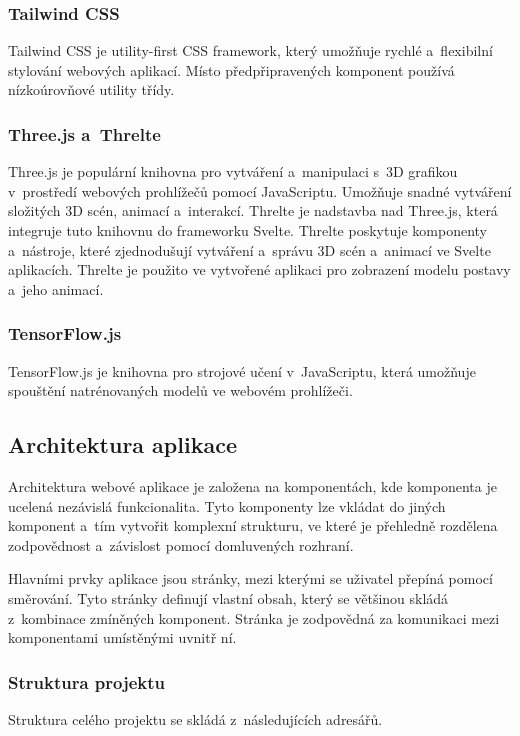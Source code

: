 \documentclass[
  master,
  program=ainfvs,
  biblatex,
  figures=true,
  tables=false,
  sourcecodes=true,
  glossaries,
  index
]{kidiplom}
\begin{document}
        \subsubsection{Tailwind CSS}
            Tailwind CSS je utility-first CSS framework, který umožňuje rychlé a~flexibilní stylování webových aplikací. Místo předpřipravených komponent používá nízkoúrovňové utility třídy. \cite{tailwind}
    
          \subsubsection{Three.js a~Threlte}
            Three.js je populární knihovna pro vytváření a~manipulaci s~3D grafikou v~prostředí webových prohlížečů pomocí JavaScriptu. Umožňuje snadné vytváření složitých 3D scén, animací a~interakcí. \cite{threejs} Threlte je nadstavba nad Three.js, která integruje tuto knihovnu do frameworku Svelte. Threlte poskytuje komponenty a~nástroje, které zjednodušují vytváření a~správu 3D scén a~animací ve Svelte aplikacích. 
            Threlte je použito ve vytvořené aplikaci pro zobrazení modelu postavy a~jeho animací. \cite{threlte}
        
        \subsubsection{TensorFlow.js}
            TensorFlow.js je knihovna pro strojové učení v~JavaScriptu, která umožňuje spouštění natrénovaných modelů ve webovém prohlížeči.

    \subsection{Architektura aplikace}
        Architektura webové aplikace je založena na komponentách, kde komponenta je ucelená nezávislá funkcionalita. Tyto komponenty lze vkládat do jiných komponent a~tím vytvořit komplexní strukturu, ve které je přehledně rozdělena zodpovědnost a~závislost pomocí domluvených rozhraní. 

        Hlavními prvky aplikace jsou stránky, mezi kterými se uživatel přepíná pomocí směrování. Tyto stránky definují vlastní obsah, který se většinou skládá z~kombinace zmíněných komponent. Stránka je zodpovědná za komunikaci mezi komponentami umístěnými uvnitř ní.

         \subsubsection{Struktura projektu}
            Struktura celého projektu se skládá z~následujících adresářů.
\end{document}
